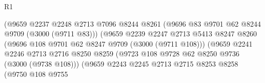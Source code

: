 \begin{lexlean}{R1}
\begin{coremodule}
                                            (@9659
                                              @2237
                                              @2248
                                              @2713
                                              @7096
                                              @8244
                                              @8261
                                              (@9696 @83 @9701 @62 @8244 @9709 (@3000 (@9711 @83)))
                                              (@9659
                                                @2239
                                                @2247
                                                @2713
                                                @5413
                                                @8247
                                                @8260
                                                (@9696
                                                  @108
                                                  @9701
                                                  @62
                                                  @8247
                                                  @9709
                                                  (@3000 (@9711 @108)))
                                                (@9659
                                                  @2241
                                                  @2246
                                                  @2713
                                                  @2716
                                                  @8250
                                                  @8259
                                                  (@9723
                                                    @108
                                                    @9728
                                                    @62
                                                    @8250
                                                    @9736
                                                    (@3000 (@9738 @108)))
                                                  (@9659
                                                    @2243
                                                    @2245
                                                    @2713
                                                    @2715
                                                    @8253
                                                    @8258
                                                    (@9750
                                                      @108
                                                      @9755

\end{coremodule}
\end{lexlean}
